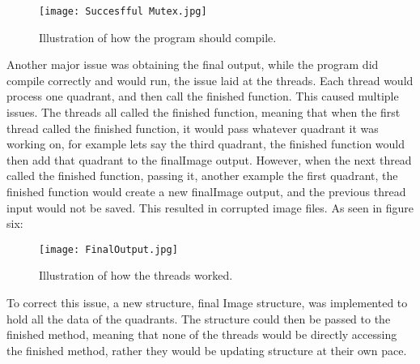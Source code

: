 \documentclass{article}
\begin{document}
\begin{figure}[htbp]
    \centering
    \texttt{[image: Succesfful Mutex.jpg]}
    \caption{Illustration of how the program should compile.}
    \label{fig: Corrected Mutex Locks}
\end{figure}

Another major issue was obtaining the final output, while the program did compile correctly and would run, the issue
laid at the threads. Each thread would process one quadrant, and then call the finished function. This caused
multiple issues. The threads all called the finished function, meaning that when the first thread called the finished
function, it would pass whatever quadrant it was working on, for example lets say the third quadrant, the finished function
would then add that quadrant to the finalImage output. However, when the next thread called the finished function,
passing it, another example the first quadrant, the finished function would create a new finalImage output, and the previous 
thread input would not be saved. This resulted in corrupted image files. As seen in figure six:\\
\begin{figure}[htbp]
    \centering
    \texttt{[image: FinalOutput.jpg]}
    \caption{Illustration of how the threads worked.}
    \label{fig: Memory Storage}
\end{figure}


To correct this issue, a new structure, final Image structure, was implemented to hold all the data of the 
quadrants. The structure could then be passed to the finished method, meaning that none of the threads would be
directly accessing the finished method, rather they would be updating structure at their own pace.\vspace{.5 cm}\\
\end{document}
